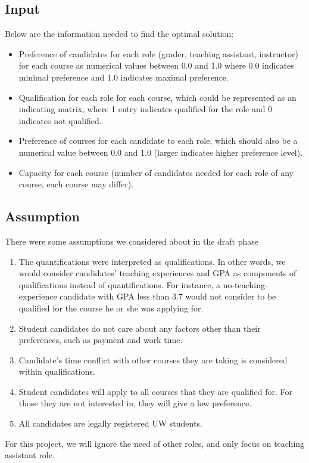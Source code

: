 \documentclass[twoside,twocolumn]{article}
\begin{document}
    \subsection{Input}
    \indent Below are the information needed to find the optimal solution:
    \begin{itemize}
        \item Preference of candidates for each role (grader, teaching assistant, instructor) for each course as numerical values between 0.0 and 
        1.0 where 0.0 indicates minimal preference and 1.0 indicates maximal preference.
        \item Qualification for each role for each course, which could be represented as an indicating matrix, where 1 entry indicates
        qualified for the role and 0 indicates not qualified.
        \item Preference of courses for each candidate to each role, which should also be a numerical value between 0.0 and 1.0 (larger indicates
        higher preference level).
        \item Capacity for each course (number of candidates needed for each role of any course, each course may differ).
    \end{itemize}
    \subsection{Assumption}
    There were some assumptions we considered about in the draft phase
    \begin{enumerate}
        \item The quantifications were interpreted as qualifications. In other words, we would consider candidates' teaching experiences and GPA 
        as components of qualifications instead of quantifications. For instance, a no-teaching-experience candidate with GPA 
        less than $3.7$ would not consider to be qualified for the course he or she was applying for.
        \item Student candidates do not care about any factors other than their preferences, such as payment and work time.
        \item Candidate's time conflict with other courses they are taking is considered within qualifications.
        \item Student candidates will apply to all courses that they are qualified for. For those they are not interested in, they will give a 
        low preference.
        \item All candidates are legally registered UW students.
    \end{enumerate}
    For this project, we will ignore the need of other roles, and only focus on teaching assistant role. 
\end{document}
